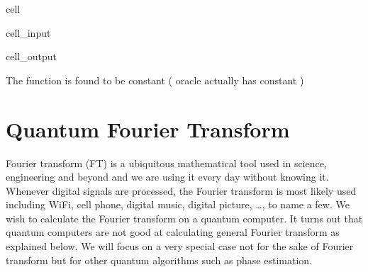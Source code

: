 \documentclass[letterpaper,10pt,english]{jupyterBook}
\begin{document}
\begin{sphinxuseclass}{cell}
\begin{sphinxVerbatimInput}
\begin{sphinxuseclass}{cell_input}
\end{sphinxuseclass}\end{sphinxVerbatimInput}
\begin{sphinxVerbatimOutput}

\begin{sphinxuseclass}{cell_output}
\begin{sphinxVerbatim}[commandchars=\\\{\}]
The function is found to be constant ( oracle actually has constant )
\end{sphinxVerbatim}

\end{sphinxuseclass}\end{sphinxVerbatimOutput}

\end{sphinxuseclass}
\sphinxstepscope


\section{Quantum Fourier Transform}
\label{\detokenize{algorithms/qft:quantum-fourier-transform}}\label{\detokenize{algorithms/qft:sec-qft}}\label{\detokenize{algorithms/qft::doc}}
\sphinxAtStartPar
Fourier transform (FT) is a ubiquitous mathematical tool used in science, engineering and beyond and we are using it every day without knowing it. Whenever digital signals are processed, the Fourier transform is most likely used including WiFi, cell phone, digital music, digital picture, …, to name a few.  We wish to calculate the Fourier transform on a quantum computer.  It turns out that quantum computers are not good at calculating general Fourier transform as explained below.  We will focus on a very special case not for the sake of Fourier transform but for other quantum algorithms such as phase estimation.
\end{document}
